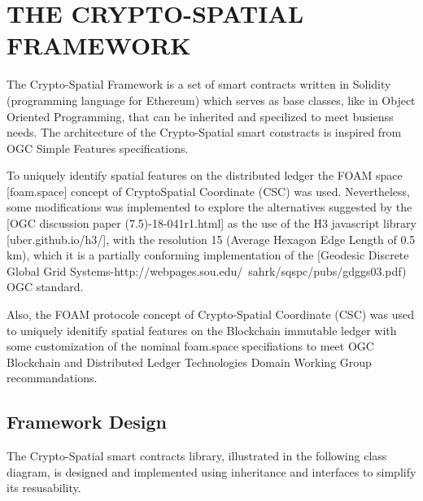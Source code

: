 \documentclass{isprs} %
\begin{document}
\newpage

\section{THE CRYPTO-SPATIAL FRAMEWORK}\label{sec:THE CRYPTO-SPATIAL FRAMEWORK}

The Crypto-Spatial Framework is a set of smart contracts written in Solidity (programming language for Ethereum) which serves as base classes, like in Object Oriented Programming, that can be inherited and specilized to meet busienss needs. The architecture of the Crypto-Spatial smart constracts is inspired from OGC Simple Features specifications. 

To uniquely identify spatial features on the distributed ledger the FOAM space [foam.space] concept of CryptoSpatial Coordinate (CSC) was used. Nevertheless, some modifications was implemented to explore the alternatives suggested by the [OGC discussion paper (7.5)-18-041r1.html] as the use of the H3 javascript library [uber.github.io/h3/], with the resolution 15 (Average Hexagon Edge Length  of 0.5 km), which it is a partially conforming implementation of the [Geodesic Discrete Global Grid Systems-http://webpages.sou.edu/~sahrk/sqspc/pubs/gdggs03.pdf) OGC standard.

Also, the FOAM protocole concept of Crypto-Spatial Coordinate (CSC) was used to uniquely idenitify spatial features on the Blockchain immutable ledger with some customization of the nominal foam.space specifiations to meet OGC Blockchain and Distributed Ledger Technologies Domain Working Group recommandations.

\subsection{Framework Design}\label{sec:Framework Design}

The Crypto-Spatial smart contracts library, illustrated in the following class diagram, is designed and implemented using inheritance and interfaces to simplify its resusability.
\end{document}
